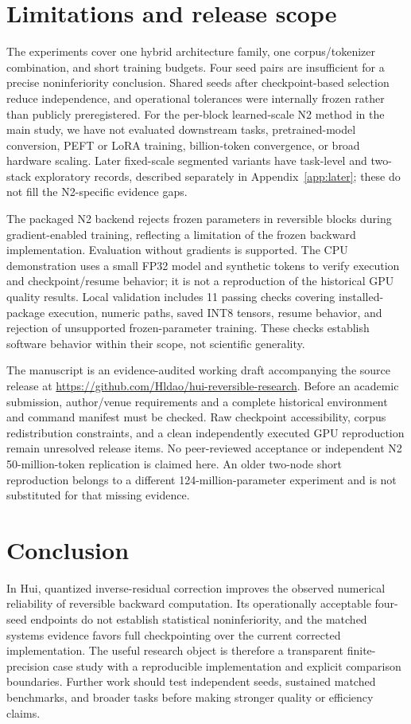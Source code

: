 \documentclass[10pt]{article}
\begin{document}
\section{Limitations and release scope}
The experiments cover one hybrid architecture family, one corpus/tokenizer combination, and short training budgets. Four seed pairs are insufficient for a precise noninferiority conclusion. Shared seeds after checkpoint-based selection reduce independence, and operational tolerances were internally frozen rather than publicly preregistered. For the per-block learned-scale N2 method in the main study, we have not evaluated downstream tasks, pretrained-model conversion, PEFT or LoRA training, billion-token convergence, or broad hardware scaling. Later fixed-scale segmented variants have task-level and two-stack exploratory records, described separately in Appendix~\ref{app:later}; these do not fill the N2-specific evidence gaps.

The packaged N2 backend rejects frozen parameters in reversible blocks during gradient-enabled training, reflecting a limitation of the frozen backward implementation. Evaluation without gradients is supported. The CPU demonstration uses a small FP32 model and synthetic tokens to verify execution and checkpoint/resume behavior; it is not a reproduction of the historical GPU quality results. Local validation includes 11 passing checks covering installed-package execution, numeric paths, saved INT8 tensors, resume behavior, and rejection of unsupported frozen-parameter training. These checks establish software behavior within their scope, not scientific generality.

The manuscript is an evidence-audited working draft accompanying the source release at \url{https://github.com/Hldao/hui-reversible-research}. Before an academic submission, author/venue requirements and a complete historical environment and command manifest must be checked. Raw checkpoint accessibility, corpus redistribution constraints, and a clean independently executed GPU reproduction remain unresolved release items. No peer-reviewed acceptance or independent N2 50-million-token replication is claimed here. An older two-node short reproduction belongs to a different 124-million-parameter experiment and is not substituted for that missing evidence.

\section{Conclusion}
In Hui, quantized inverse-residual correction improves the observed numerical reliability of reversible backward computation. Its operationally acceptable four-seed endpoints do not establish statistical noninferiority, and the matched systems evidence favors full checkpointing over the current corrected implementation. The useful research object is therefore a transparent finite-precision case study with a reproducible implementation and explicit comparison boundaries. Further work should test independent seeds, sustained matched benchmarks, and broader tasks before making stronger quality or efficiency claims.
\end{document}
